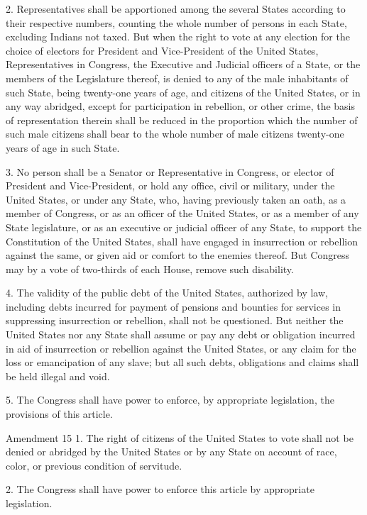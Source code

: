 \documentclass[12pt,a4paper]{article}
\begin{document}
2. Representatives shall be apportioned among the several States according to
their respective numbers, counting the whole number of persons in each State,
excluding Indians not taxed. But when the right to vote at any election for the
choice of electors for President and Vice-President of the United States,
Representatives in Congress, the Executive and Judicial officers of a State, or
the members of the Legislature thereof, is denied to any of the male
inhabitants of such State, being twenty-one years of age, and citizens of the
United States, or in any way abridged, except for participation in rebellion,
or other crime, the basis of representation therein shall be reduced in the
proportion which the number of such male citizens shall bear to the whole
number of male citizens twenty-one years of age in such State.

3. No person shall be a Senator or Representative in Congress, or elector of
President and Vice-President, or hold any office, civil or military, under the
United States, or under any State, who, having previously taken an oath, as a
member of Congress, or as an officer of the United States, or as a member of
any State legislature, or as an executive or judicial officer of any State, to
support the Constitution of the United States, shall have engaged in
insurrection or rebellion against the same, or given aid or comfort to the
enemies thereof. But Congress may by a vote of two-thirds of each House, remove
such disability.

4. The validity of the public debt of the United States, authorized by law,
including debts incurred for payment of pensions and bounties for services in
suppressing insurrection or rebellion, shall not be questioned. But neither the
United States nor any State shall assume or pay any debt or obligation incurred
in aid of insurrection or rebellion against the United States, or any claim for
the loss or emancipation of any slave; but all such debts, obligations and
claims shall be held illegal and void.

5. The Congress shall have power to enforce, by appropriate legislation, the
provisions of this article.

Amendment 15
1. The right of citizens of the United States to vote shall not be denied or
abridged by the United States or by any State on account of race, color, or
previous condition of servitude.

2. The Congress shall have power to enforce this article by appropriate
legislation.
\end{document}
